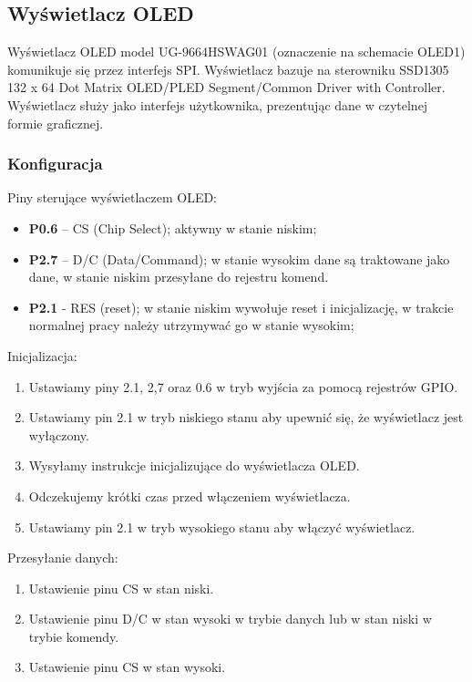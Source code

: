 \subsection{Wyświetlacz OLED}

Wyświetlacz OLED model UG-9664HSWAG01 (oznaczenie na schemacie OLED1) komunikuje się przez interfejs SPI. Wyświetlacz bazuje na sterowniku SSD1305 132 x 64 Dot Matrix OLED/PLED Segment/Common Driver with Controller. Wyświetlacz służy jako interfejs użytkownika, prezentując dane w czytelnej formie graficznej.

\subsubsection{Konfiguracja}
Piny sterujące wyświetlaczem OLED:
\begin{itemize}
\item \textbf{P0.6} – CS (Chip Select); aktywny w stanie niskim;
\item \textbf{P2.7} – D/C (Data/Command); w stanie wysokim dane są traktowane jako dane, w stanie niskim przesyłane do rejestru komend.
\item \textbf{P2.1} - RES (reset); w stanie niskim wywołuje reset i inicjalizację, w trakcie normalnej pracy należy utrzymywać go w stanie wysokim;
\end{itemize}
Inicjalizacja:
\begin{enumerate}
    \item Ustawiamy piny 2.1, 2,7 oraz 0.6 w tryb wyjścia za pomocą rejestrów GPIO. %
    \item Ustawiamy pin 2.1 w tryb niskiego stanu aby upewnić się, że wyświetlacz jest wyłączony.
    \item Wysyłamy instrukcje inicjalizujące do wyświetlacza OLED.
    \item Odczekujemy krótki czas przed włączeniem wyświetlacza.
    \item Ustawiamy pin 2.1 w tryb wysokiego stanu aby włączyć wyświetlacz.
\end{enumerate}
Przesyłanie danych:
\begin{enumerate}
    \item Ustawienie pinu CS w stan niski.
    \item Ustawienie pinu D/C w stan wysoki w trybie danych lub w stan niski w trybie komendy.
    \item Ustawienie pinu CS w stan wysoki.
\end{enumerate}


